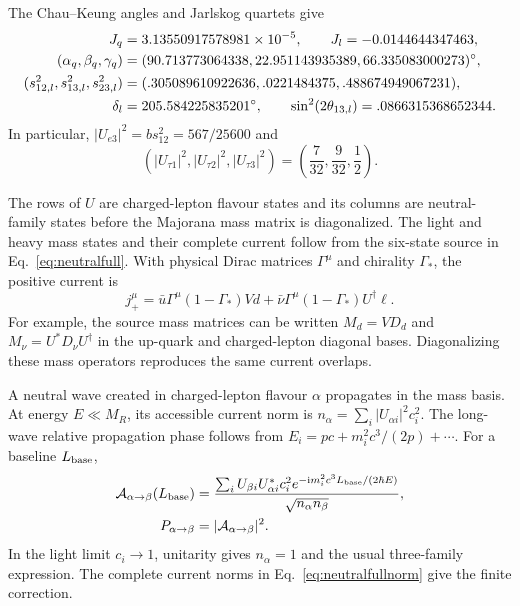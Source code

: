 \documentclass[aps,prx,onecolumn,10pt,notitlepage,nofootinbib,longbibliography]{revtex4-2}
\numberwithin{equation}{section}
\numberwithin{table}{section}
\newcommand{\ii}{\mathrm i}
\begin{document}
The Chau--Keung angles and Jarlskog quartets\cite{ChauKeung,Jarlskog} give
\begin{align}
 J_q&=3.13550917578981\times10^{-5},\qquad
 J_l=-0.0144644347463,\notag\\
 (\alpha_q,\beta_q,\gamma_q)
 &=(90.713773064338,22.951143935389,66.335083000273)^\circ,\notag\\
 (s_{12,l}^2,s_{13,l}^2,s_{23,l}^2)
 &=(.305089610922636,.0221484375,.488674949067231),\notag\\
 \delta_l&=205.584225835201^\circ,
 \qquad \sin^2(2\theta_{13,l})=.0866315368652344.
\end{align}
In particular, $|U_{e3}|^2=bs_{12}^2=567/25600$ and
\begin{equation}
 (|U_{\tau1}|^2,|U_{\tau2}|^2,|U_{\tau3}|^2)
 =\left(\frac7{32},\frac9{32},\frac12\right).
 \label{eq:taurow}
\end{equation}

The rows of $U$ are charged-lepton flavour states and its columns are neutral-family states before the Majorana mass matrix is diagonalized. The light and heavy mass states and their complete current follow from the six-state source in Eq.~\eqref{eq:neutralfull}. With physical Dirac matrices $\Gamma^\mu$ and chirality $\Gamma_*$, the positive current is
\begin{equation}
 j_+^\mu=\bar u\Gamma^\mu(1-\Gamma_*)Vd
 +\bar\nu\Gamma^\mu(1-\Gamma_*)U^\dagger\ell.
 \label{eq:chargedcurrent}
\end{equation}
For example, the source mass matrices can be written $M_d=VD_d$ and $M_\nu=U^*D_\nu U^\dagger$ in the up-quark and charged-lepton diagonal bases. Diagonalizing these mass operators reproduces the same current overlaps.

A neutral wave created in charged-lepton flavour $\alpha$ propagates in the
mass basis. At energy $E\ll M_R$, its accessible current norm is
$n_\alpha=\sum_i|U_{\alpha i}|^2c_i^2$. The long-wave relative propagation
phase follows from $E_i=p c+m_i^2c^3/(2p)+\cdots$. For a baseline $L_{\rm base}$,
\begin{align}
 \mathcal A_{\alpha\to\beta}(L_{\rm base})
 &=\frac{\sum_i U_{\beta i}U_{\alpha i}^*c_i^2
 e^{-\ii m_i^2c^3L_{\rm base}/(2\hbar E)}}{\sqrt{n_\alpha n_\beta}},\notag\\
 P_{\alpha\to\beta}&=|\mathcal A_{\alpha\to\beta}|^2.
 \label{eq:oscillation}
\end{align}
In the light limit $c_i\to1$, unitarity gives $n_\alpha=1$ and the usual
three-family expression. The complete current norms in
Eq.~\eqref{eq:neutralfullnorm} give the finite correction.
\end{document}
